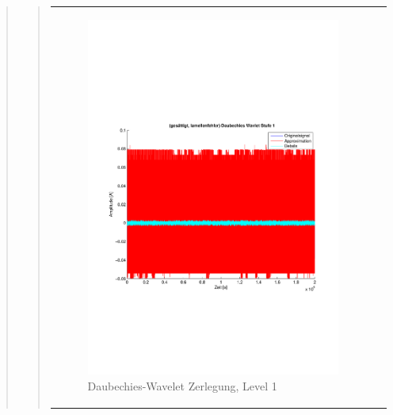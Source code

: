 \begin{quote}
\begin{quote}
\begin{center}
\begin{tabular}{ll}
\begin{minipage}{0.6\textwidth}
                        \begin{figure}[H]
                            \label{fig:}
                            \includegraphics[scale=0.4, trim = 2cm 6cm 1cm
                            7.5cm,
                            clip]{./Bilder/Termin8/lamellenfehler_gesaettigt_Daubechies_Wavlet_lvl_1}
                            \caption{Daubechies-Wavelet Zerlegung, Level 1}
                        \end{figure}
                    \vspace{-1.5em}
    
                    \end{minipage}
    
                \end{tabular}
                \end{center}
                

\end{quote}
\end{quote}
